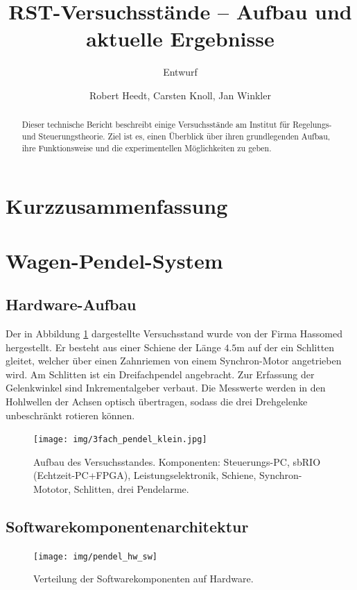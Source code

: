 \documentclass[a4paper,10pt]{scrartcl}
\title{RST-Versuchsstände  -- Aufbau und aktuelle Ergebnisse}
\subtitle{Entwurf}
\author{Robert Heedt, Carsten Knoll, Jan Winkler}
\begin{document}
\maketitle

\section*{Kurzzusammenfassung}
\begin{abstract}
Dieser technische Bericht beschreibt einige Versuchsstände am Institut für Regelungs- und Steuerungstheorie.
Ziel ist es, einen Überblick über ihren grundlegenden Aufbau, ihre Funktionsweise und die experimentellen Möglichkeiten zu geben.
\end{abstract}

\section{Wagen-Pendel-System}



\subsection{Hardware-Aufbau} 

Der in Abbildung \ref{fig_3fachpendel_foto} dargestellte Versuchsstand wurde von der Firma Hassomed \cite{Hassomed} hergestellt.
Er besteht aus einer Schiene der Länge $4.5$m auf der ein Schlitten gleitet, welcher über einen Zahnriemen von einem Synchron-Motor angetrieben wird.
Am Schlitten ist ein Dreifachpendel angebracht. Zur Erfassung der Gelenkwinkel sind Inkrementalgeber verbaut. Die Messwerte werden in den Hohlwellen der Achsen optisch übertragen, sodass die drei Drehgelenke unbeschränkt rotieren können. 
\begin{figure}[h!]
\begin{center}
\texttt{[image: img/3fach\_pendel\_klein.jpg]}
\end{center}
\caption{Aufbau des Versuchsstandes. Komponenten: Steuerungs-PC, sbRIO (Echtzeit-PC+FPGA), Leistungselektronik, Schiene, Synchron-Mototor, Schlitten, drei Pendelarme.}
\label{fig_3fachpendel_foto}
\end{figure}


\subsection{Softwarekomponentenarchitektur }

\begin{figure}[ht]
    \begin{center}
    \texttt{[image: img/pendel\_hw\_sw]}
    \end{center}
    \caption{Verteilung der Softwarekomponenten auf Hardware.}
    \label{fig_hw_sw}
\end{figure}
\end{document}
